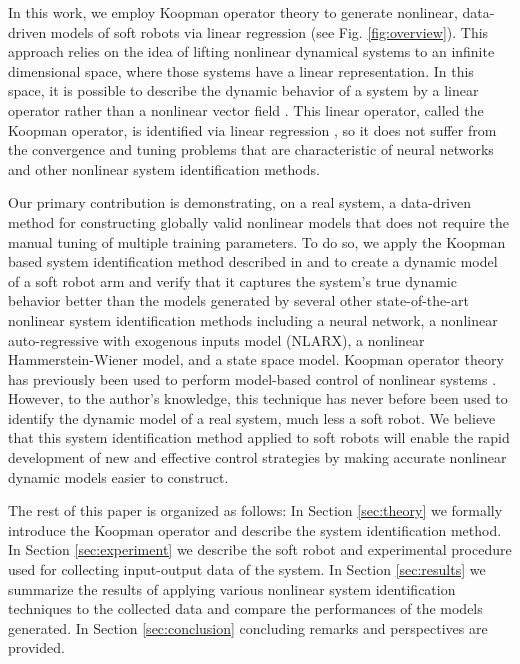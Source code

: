 In this work, we employ Koopman operator theory to generate nonlinear, data-driven models of soft robots via linear regression (see Fig. \ref{fig:overview}).
This approach relies on the idea of lifting nonlinear dynamical systems to an infinite dimensional space, where those systems have a linear representation.
In this space, it is possible to describe the dynamic behavior of a system by a linear operator rather than a nonlinear vector field \cite{budivsic2012applied}.
This linear operator, called the Koopman operator, is identified via linear regression \cite{williams2015data}, so it does not suffer from the convergence and tuning problems that are characteristic of neural networks and other nonlinear system identification methods.


Our primary contribution is demonstrating, on a real system, a data-driven method for constructing globally valid nonlinear models that does not require the manual tuning of multiple training parameters.
To do so, we apply the Koopman based system identification method described in \cite{mauroy2016linear} and \cite{mauroy2017koopman} to create a dynamic model of a soft robot arm and verify that it captures the system's true dynamic behavior better than the models generated by several other state-of-the-art nonlinear system identification methods including a neural network, a nonlinear auto-regressive with exogenous inputs model (NLARX), a nonlinear Hammerstein-Wiener model, and a state space model.
Koopman operator theory has previously been used to perform model-based control  of nonlinear systems \cite{Abraham-RSS-17}.
However, to the author's knowledge, this technique has never before been used to identify the dynamic model of a real system, much less a soft robot.
We believe that this system identification method applied to soft robots will enable the rapid development of new and effective control strategies by making accurate nonlinear dynamic models easier to construct.


The rest of this paper is organized as follows:
In Section \ref{sec:theory} we formally introduce the Koopman operator and describe the system identification method. 
In Section \ref{sec:experiment} we describe the soft robot and experimental procedure used for collecting input-output data of the system.
In Section \ref{sec:results} we summarize the results of applying various nonlinear system identification techniques to the collected data and compare the performances of the models generated. 
In Section \ref{sec:conclusion} concluding remarks and perspectives are provided.